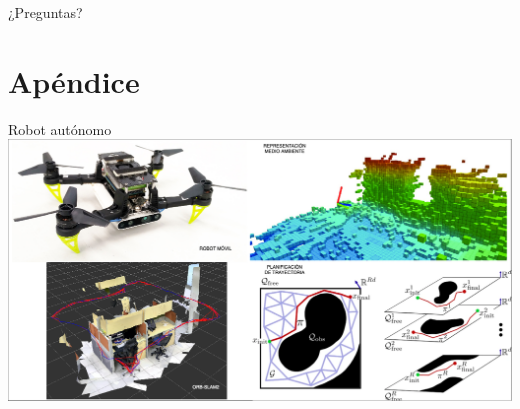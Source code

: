 \documentclass[24pt,aspectratio=169]{beamer}
\begin{document}
\begin{frame}[standout]
  ¿Preguntas?
\end{frame}

\appendix

\section{Apéndice}

\begin{frame}{Robot autónomo}
  \centering
  \includegraphics[width=\linewidth]{ANTECEDENTES}\\
\end{frame}
\end{document}
